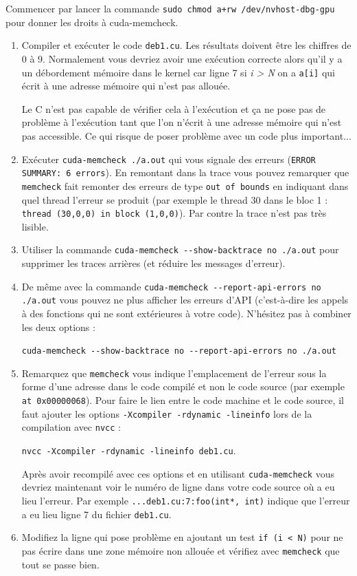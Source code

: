 \begin{wtodo}{}

Commencer par lancer la commande {\tt sudo chmod a+rw /dev/nvhost-dbg-gpu} pour donner les droits à cuda-memcheck.

\begin{enumerate}
	\item  Compiler et exécuter le code {\tt deb1.cu}. Les résultats doivent être les chiffres de 0 à 9. Normalement vous devriez avoir une exécution correcte alors qu'il y a un débordement mémoire dans le kernel car ligne 7 si {\it i > N} on a {\tt a[i]} qui écrit à une adresse mémoire qui n'est pas allouée.
	
	Le C n'est pas capable de vérifier cela à l'exécution et ça ne pose pas de problème à l'exécution tant que l'on n'écrit à une adresse mémoire qui n'est pas accessible. Ce qui risque de poser problème avec un code plus important...
	\item  Exécuter {\tt cuda-memcheck ./a.out} qui vous signale des erreurs ({\tt ERROR SUMMARY: 6 errors}). En remontant dans la trace vous pouvez remarquer que {\tt memcheck} fait remonter des erreurs de type {\tt out of bounds} en indiquant dans quel thread l'erreur se produit (par exemple le thread 30 dans le bloc 1 : {\tt thread (30,0,0) in block (1,0,0)}). Par contre la trace n'est pas très lisible.
	\item Utiliser la commande {\tt cuda-memcheck -{}-show-backtrace no ./a.out} pour supprimer les traces arrières (et réduire les messages d'erreur).
	\item De même avec la commande {\tt cuda-memcheck -{}-report-api-errors no ./a.out} vous pouvez ne plus afficher les erreurs d'API (c'est-à-dire les appels à des fonctions qui ne sont extérieures à votre code). N'hésitez pas à combiner les deux options :
	
	{\tt cuda-memcheck -{}-show-backtrace no   -{}-report-api-errors no ./a.out}
	
	\item  Remarquez que {\tt memcheck} vous indique l'emplacement de l'erreur sous la forme d'une adresse dans le code compilé et non le code source (par exemple {\tt at 0x00000068}).  Pour faire le lien entre le code machine et le code source, il faut ajouter les options {\tt -Xcompiler -rdynamic -lineinfo} lors de la compilation avec {\tt nvcc} :
	
	 {\tt nvcc -Xcompiler -rdynamic -lineinfo deb1.cu}. 
	 
	 Après avoir recompilé avec ces options et en utilisant {\tt cuda-memcheck} vous devriez maintenant voir le numéro de ligne dans votre code source où a eu lieu l'erreur. Par exemple {\tt ...deb1.cu:7:foo(int*, int)} indique que l'erreur a eu lieu ligne 7 du fichier {\tt deb1.cu}.

	\item Modifiez la ligne qui pose problème en ajoutant un test {\tt if (i < N)} pour ne pas écrire dans une zone mémoire non allouée et vérifiez avec {\tt memcheck} que tout se passe bien.
\end{enumerate}

\end{wtodo}

